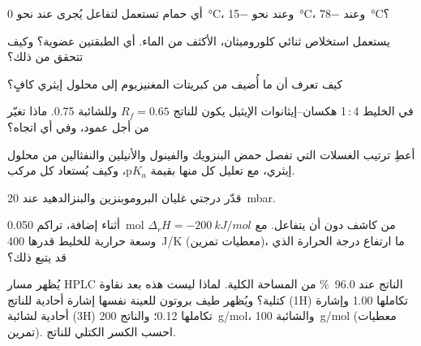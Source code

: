 \begin{exercise}[$\star$]\label{exo:b2:lab-techniques-2:1}
أي حمام تستعمل لتفاعل يُجرى عند نحو \qty{0}{\degreeCelsius}، وعند نحو
\qty{-15}{\degreeCelsius}، وعند \qty{-78}{\degreeCelsius}؟
\end{exercise}

\begin{exercise}[$\star$]\label{exo:b2:lab-techniques-2:2}
يستعمل استخلاص ثنائي كلوروميثان، الأكثف من الماء. أي الطبقتين عضوية؟ وكيف تتحقق من ذلك؟
\end{exercise}

\begin{exercise}[$\star$]\label{exo:b2:lab-techniques-2:3}
كيف تعرف أن ما أُضيف من كبريتات المغنيزيوم إلى محلول إيثري كافٍ؟
\end{exercise}

\begin{exercise}[$\star$]\label{exo:b2:lab-techniques-2:4}
في الخليط 4\,:\,1 هكسان--إيثانوات الإيثيل يكون للناتج $R_f = 0.65$ وللشائبة 0.75. ماذا تغيّر
من أجل عمود، وفي أي اتجاه؟
\end{exercise}

\begin{exercise}[$\star\star$]\label{exo:b2:lab-techniques-2:5}
أعطِ ترتيب الغسلات التي تفصل حمض البنزويك والفينول والأنيلين والنفثالين من محلول
إيثري، مع تعليل كل منها بقيمة $\mathrm pK_a$، وكيف يُستعاد كل مركب.
\end{exercise}

\begin{exercise}[$\star\star$]\label{exo:b2:lab-techniques-2:6}
قدّر درجتي غليان البروموبنزين والبنزالدهيد عند \qty{20}{mbar}.
\end{exercise}

\begin{exercise}[$\star\star$]\label{exo:b2:lab-techniques-2:7}
أثناء إضافة، تراكم \qty{0.050}{mol} من كاشف دون أن يتفاعل. مع $\Delta_rH =
\qty{-200}{kJ/mol}$ وسعة حرارية للخليط قدرها \qty{400}{J/K} (معطيات تمرين)، ما
ارتفاع درجة الحرارة الذي قد يتبع ذلك؟
\end{exercise}

\begin{exercise}[$\star\star$]\label{exo:b2:lab-techniques-2:8}
يُظهر مسار HPLC الناتج عند 96.0~\% من المساحة الكلية. لماذا ليست هذه بعد نقاوة كتلية؟ 
ويُظهر طيف بروتون للعينة نفسها إشارة أحادية للناتج (1H) تكاملها 1.00 وإشارة أحادية لشائبة
(3H) تكاملها 0.12؛ والناتج \qty{200}{g/mol}، والشائبة \qty{100}{g/mol} (معطيات تمرين). احسب
الكسر الكتلي للناتج.
\end{exercise}

